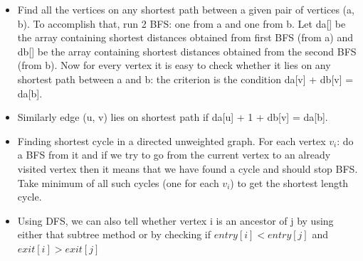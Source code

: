 \documentclass[8pt, a4paper, oneside, twocolumn]{extarticle}
\begin{document}
\begin{itemize}
    \item Find all the vertices on any shortest path between a given pair of vertices (a, b). To accomplish that, run 2 BFS: one from a and one from b. Let da[] be the array containing shortest distances obtained from first BFS (from a) and db[] be the array containing shortest distances obtained from the second BFS (from b). Now for every vertex it is easy to check whether it lies on any shortest path between a and b: the criterion is the condition da[v] + db[v] = da[b].
    \item Similarly edge (u, v) lies on shortest path if da[u] + 1 + db[v] = da[b].
    \item Finding shortest cycle in a directed unweighted graph. For each vertex $v_i$: do a BFS from it and if we try to go from the current vertex to an already visited vertex then it means that we have found a cycle and should stop BFS.
    \\Take minimum of all such cycles (one for each $v_i$) to get the shortest length cycle.
    \item Using DFS, we can also tell whether vertex i is an ancestor of j by using either that subtree method or by checking if $entry[i] < entry[j]$ and $exit[i] > exit[j]$
\end{itemize}
\end{document}
